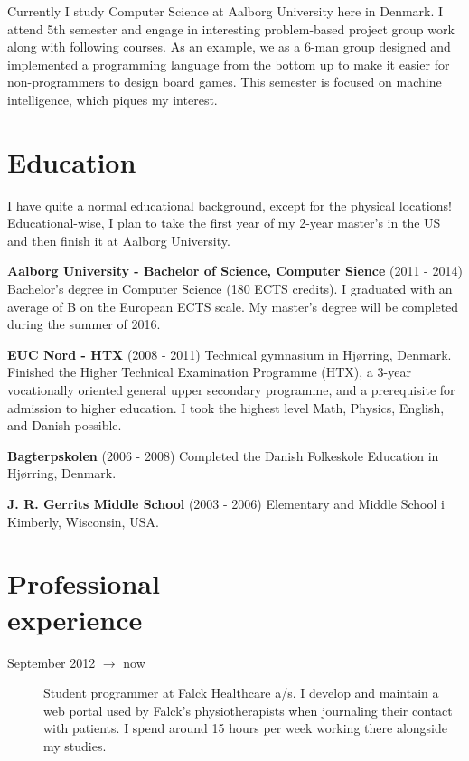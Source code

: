 \documentclass[margin,line,a4paper]{resume}
\begin{document}
\begin{resume}
    Currently I study Computer Science at Aalborg University here
    in Denmark. I attend 5th semester and engage in interesting
    problem-based project group work along with following courses.
    As an example, we as a 6-man group designed and implemented a
    programming language from the bottom up to make it easier for
    non-programmers to design board games. This semester is focused on
    machine intelligence, which piques my interest.

    \section{\mysidestyle Education}
    I have quite a normal educational background, except for the
    physical locations! Educational-wise, I plan to take the first year of
    my 2-year master's in the US and then finish it at Aalborg University.

    \textbf{Aalborg University - Bachelor of Science, Computer Sience}
    (2011 - 2014) Bachelor's degree in Computer Science (180 ECTS
    credits). I graduated with an average of B on the European ECTS
    scale. My master's degree will be completed during the summer of
    2016.
      
    \textbf{EUC Nord - HTX} (2008 - 2011) Technical gymnasium
    in Hjørring, Denmark. Finished the Higher Technical Examination
    Programme (HTX), a 3-year vocationally oriented general upper
    secondary programme, and a prerequisite for admission to higher
    education. I took the highest level Math, Physics, English, and
    Danish possible.
    
    \textbf{Bagterpskolen} (2006 - 2008) Completed the Danish
    Folkeskole Education in Hjørring, Denmark.

    \textbf{J. R. Gerrits Middle School} (2003 - 2006) Elementary and 
    Middle School i Kimberly, Wisconsin, USA.

\pagebreak
\section{\mysidestyle Professional\\experience}\vspace{1mm}
\begin{description}

  \item[September 2012 $\rightarrow$ now] Student programmer at Falck
  Healthcare a/s. I develop and maintain a web portal used by
  Falck's physiotherapists when journaling their contact with patients.
  I spend around 15 hours per week working there alongside my studies.


\end{description}
\end{resume}
\end{document}
